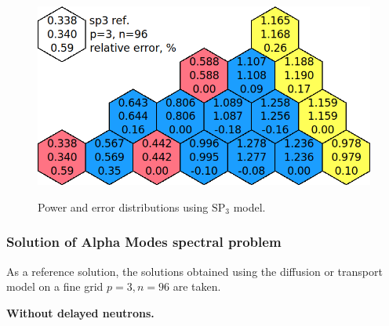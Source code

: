 \documentclass[authoryear]{elsarticle}
\begin{document}
\begin{figure}[h]
\begin{center}
	\includegraphics[width=0.85\linewidth]{sp3_p3n96.png}\\
	\caption{Power and error distributions using $\mathrm{SP_3}$ model.}
	\label{ris:power2}
\end{center}
\end{figure}

\subsubsection{Solution of Alpha Modes spectral problem}
As a reference solution, the solutions obtained using the diffusion or transport model on a fine grid $ p = 3, n = 96 $ are taken.
 
\textbf{Without delayed neutrons.}

\end{document}
